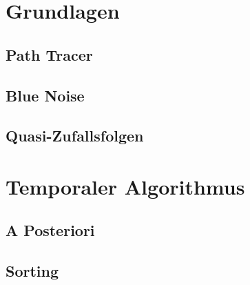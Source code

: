 \vfill
\chapter{Grundlagen}
\label{ch:Grundlagen}


\section{Path Tracer}
\label{ch:Content1:sec:PathTracer}



\newpage
\section{Blue Noise}
\label{ch:Content1:sec:BlueNoise}



\newpage
\section{Quasi-Zufallsfolgen}
\label{ch:Content1:sec:QuasiRandomSequences}





\newpage
\chapter{Temporaler Algorithmus}
\label{ch:TemporalerAlgorithmus}




\section{A Posteriori}
\label{ch:Content2:sec:APosteriori}




\section{Sorting}
\label{ch:Content2:sec:Sorting}





